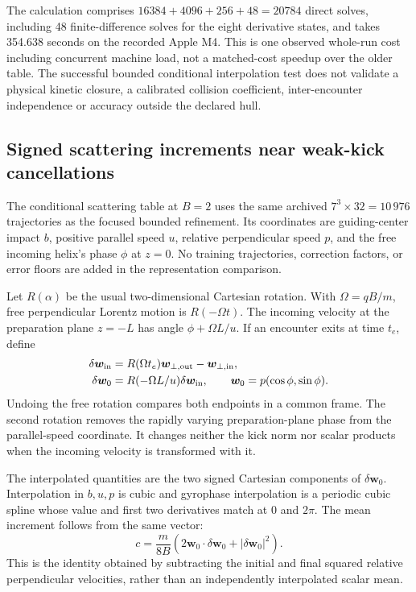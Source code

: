 \documentclass[11pt,letterpaper]{article}
\begin{document}
The calculation comprises $16384+4096+256+48=20784$ direct solves, including
48 finite-difference solves for the eight derivative states, and takes
354.638 seconds on the recorded Apple M4. This is one observed whole-run
cost including concurrent machine load, not a matched-cost speedup over the
older table. The successful bounded conditional interpolation test does not
validate a physical kinetic closure, a calibrated collision coefficient,
inter-encounter independence or accuracy outside the declared hull.

\subsection*{Signed scattering increments near weak-kick cancellations}
\label{sec:signed-scattering-interpolation}

The conditional scattering table at $B=2$ uses the same archived
$7^3\times32=10\,976$ trajectories as the focused bounded refinement.
Its coordinates are guiding-center impact $b$, positive parallel speed $u$,
relative perpendicular speed $p$, and the free incoming helix's phase $\phi$
at $z=0$.  No training trajectories, correction factors, or error floors are
added in the representation comparison.

Let $R(\alpha)$ be the usual two-dimensional Cartesian rotation.  With
$\Omega=qB/m$, free perpendicular Lorentz motion is $R(-\Omega t)$.
The incoming velocity at the preparation plane $z=-L$ has angle
$\phi+\Omega L/u$.  If an encounter exits at time $t_e$, define
\begin{align}
 \delta\boldsymbol w_{\rm in}
   &=R(\Omega t_e)\boldsymbol w_{\perp,{\rm out}}
          -\boldsymbol w_{\perp,{\rm in}},\\
 \delta\boldsymbol w_0
   &=R(-\Omega L/u)\delta\boldsymbol w_{\rm in},
 \qquad \boldsymbol w_0=p(\cos\phi,\sin\phi).
 \label{eq:zero-plane-kick}
\end{align}
Undoing the free rotation compares both endpoints in a common frame.  The
second rotation removes the rapidly varying preparation-plane phase from the
parallel-speed coordinate.  It changes neither the kick norm nor scalar
products when the incoming velocity is transformed with it.

The interpolated quantities are the two signed Cartesian components of
$\delta\boldsymbol w_0$.  Interpolation in $b,u,p$ is cubic and gyrophase
interpolation is a periodic cubic spline whose value and first two derivatives
match at $0$ and $2\pi$.  The mean increment follows from the same vector:
\begin{equation}
 c=\frac{m}{8B}
   \left(2\boldsymbol w_0\cdot\delta\boldsymbol w_0
                   +|\delta\boldsymbol w_0|^2\right).
 \label{eq:signed-kick-mean}
\end{equation}
This is the identity obtained by subtracting the initial and final squared
relative perpendicular velocities, rather than an independently interpolated
scalar mean.
\end{document}
